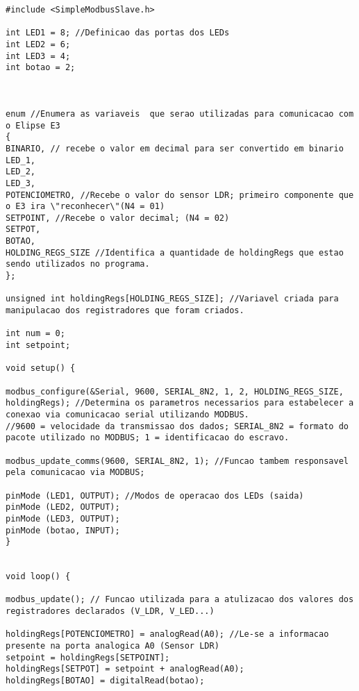 \begin{lstlisting}[language=Arduino]
#include <SimpleModbusSlave.h>

int LED1 = 8; //Definicao das portas dos LEDs
int LED2 = 6;
int LED3 = 4;
int botao = 2;



enum //Enumera as variaveis  que serao utilizadas para comunicacao com o Elipse E3
{
BINARIO, // recebe o valor em decimal para ser convertido em binario
LED_1, 
LED_2, 
LED_3,
POTENCIOMETRO, //Recebe o valor do sensor LDR; primeiro componente que o E3 ira \"reconhecer\"(N4 = 01)
SETPOINT, //Recebe o valor decimal; (N4 = 02)
SETPOT,
BOTAO,  
HOLDING_REGS_SIZE //Identifica a quantidade de holdingRegs que estao sendo utilizados no programa.
};

unsigned int holdingRegs[HOLDING_REGS_SIZE]; //Variavel criada para manipulacao dos registradores que foram criados. 

int num = 0;
int setpoint;

void setup() {

modbus_configure(&Serial, 9600, SERIAL_8N2, 1, 2, HOLDING_REGS_SIZE, holdingRegs); //Determina os parametros necessarios para estabelecer a conexao via comunicacao serial utilizando MODBUS.
//9600 = velocidade da transmissao dos dados; SERIAL_8N2 = formato do pacote utilizado no MODBUS; 1 = identificacao do escravo.

modbus_update_comms(9600, SERIAL_8N2, 1); //Funcao tambem responsavel pela comunicacao via MODBUS; 

pinMode (LED1, OUTPUT); //Modos de operacao dos LEDs (saida)
pinMode (LED2, OUTPUT);
pinMode (LED3, OUTPUT);
pinMode (botao, INPUT);
}


void loop() {

modbus_update(); // Funcao utilizada para a atulizacao dos valores dos registradores declarados (V_LDR, V_LED...)

holdingRegs[POTENCIOMETRO] = analogRead(A0); //Le-se a informacao presente na porta analogica A0 (Sensor LDR)
setpoint = holdingRegs[SETPOINT];
holdingRegs[SETPOT] = setpoint + analogRead(A0);
holdingRegs[BOTAO] = digitalRead(botao);


\end{lstlisting}
